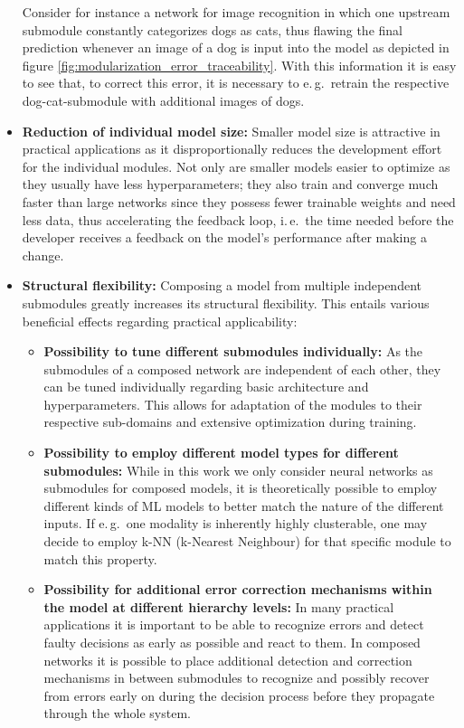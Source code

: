 \begin{itemize}
    Consider for instance a network for image recognition in which one upstream submodule constantly categorizes dogs as cats, thus flawing the final prediction whenever an image of a dog is input into the model as depicted in figure \ref{fig:modularization_error_traceability}. With this information it is easy to see that, to correct this error, it is necessary to e.\,g.\ retrain the respective dog-cat-submodule with additional images of dogs.
    \item \textbf{Reduction of individual model size:} Smaller model size is attractive in practical applications as it disproportionally reduces the development effort for the individual modules. Not only are smaller models easier to optimize as they usually have less hyperparameters; they also train and converge much faster than large networks since they possess fewer trainable weights and need less data, thus accelerating the feedback loop, i.\,e.\ the time needed before the developer receives a feedback on the model's performance after making a change.
    \item \textbf{Structural flexibility:} Composing a model from multiple independent submodules greatly increases its structural flexibility. This entails various beneficial effects regarding practical applicability:
        \begin{itemize}
            \item \textbf{Possibility to tune different submodules individually:} As the submodules of a composed network are independent of each other, they can be tuned individually regarding basic architecture and hyperparameters. This allows for adaptation of the modules to their respective sub-domains and extensive optimization during training.
            \item \textbf{Possibility to employ different model types for different submodules:} While in this work we only consider neural networks as submodules for composed models, it is theoretically possible to employ different kinds of ML models to better match the nature of the different inputs. If e.\,g.\ one modality is inherently highly clusterable, one may decide to employ k-NN (k-Nearest Neighbour) for that specific module to match this property.
            \item \textbf{Possibility for additional error correction mechanisms within the model at different hierarchy levels:} In many practical applications it is important to be able to recognize errors and detect faulty decisions as early as possible and react to them. In composed networks it is possible to place additional detection and correction mechanisms in between submodules to recognize and possibly recover from errors early on during the decision process before they propagate through the whole system.
            

\end{itemize}
\end{itemize}
